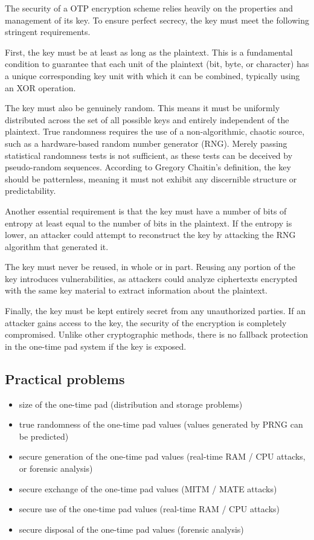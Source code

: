 The security of a OTP encryption scheme relies heavily on the
properties and management of its key. To ensure perfect secrecy, the
key must meet the following stringent requirements.

First, the key must be at least as long as the plaintext. This is a
fundamental condition to guarantee that each unit of the plaintext
(bit, byte, or character) has a unique corresponding key unit with
which it can be combined, typically using an XOR operation.

The key must also be genuinely random. This means it must be uniformly
distributed across the set of all possible keys and entirely
independent of the plaintext. True randomness requires the use of a
non-algorithmic, chaotic source, such as a hardware-based random
number generator (RNG). Merely passing statistical randomness tests is
not sufficient, as these tests can be deceived by pseudo-random
sequences. According to Gregory Chaitin's definition, the key should
be patternless, meaning it must not exhibit any discernible structure
or predictability.

Another essential requirement is that the key must have a number of
bits of entropy at least equal to the number of bits in the plaintext.
If the entropy is lower, an attacker could attempt to reconstruct the
key by attacking the RNG algorithm that generated it.

The key must never be reused, in whole or in part. Reusing any portion
of the key introduces vulnerabilities, as attackers could analyze
ciphertexts encrypted with the same key material to extract
information about the plaintext.

Finally, the key must be kept entirely secret from any unauthorized
parties. If an attacker gains access to the key, the security of the
encryption is completely compromised. Unlike other cryptographic
methods, there is no fallback protection in the one-time pad system if
the key is exposed.

\subsection{Practical problems}
\begin{itemize}
  \item size of the one-time pad (distribution and storage problems)
  \item true randomness of the one-time pad values (values generated by
    PRNG can be predicted)
  \item secure generation of the one-time pad values (real-time RAM /
    CPU attacks, or forensic analysis)
  \item secure exchange of the one-time pad values (MITM / MATE attacks)
  \item secure use of the one-time pad values (real-time RAM / CPU
    attacks)
  \item secure disposal of the one-time pad values (forensic analysis)
\end{itemize}


